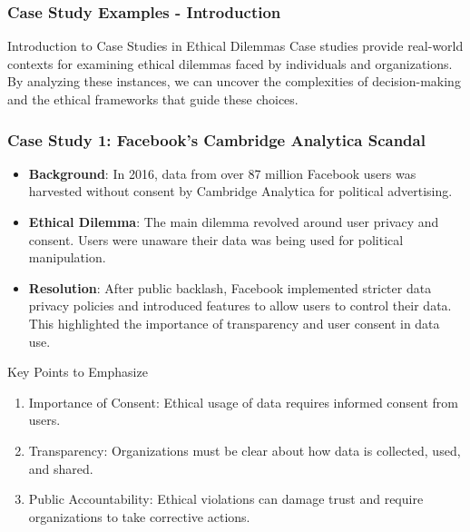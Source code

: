 \documentclass{beamer}
\begin{document}
\begin{frame}[fragile]
    \frametitle{Case Study Examples - Introduction}
    \begin{block}{Introduction to Case Studies in Ethical Dilemmas}
        Case studies provide real-world contexts for examining ethical dilemmas faced by individuals and organizations. 
        By analyzing these instances, we can uncover the complexities of decision-making and the ethical frameworks that guide these choices.
    \end{block}
\end{frame}

\begin{frame}[fragile]
    \frametitle{Case Study 1: Facebook's Cambridge Analytica Scandal}
    \begin{itemize}
        \item \textbf{Background}: In 2016, data from over 87 million Facebook users was harvested without consent by Cambridge Analytica for political advertising.
        \item \textbf{Ethical Dilemma}: The main dilemma revolved around user privacy and consent. Users were unaware their data was being used for political manipulation.
        \item \textbf{Resolution}: After public backlash, Facebook implemented stricter data privacy policies and introduced features to allow users to control their data. 
        This highlighted the importance of transparency and user consent in data use.
    \end{itemize}
    
    \begin{block}{Key Points to Emphasize}
        \begin{enumerate}
            \item Importance of Consent: Ethical usage of data requires informed consent from users.
            \item Transparency: Organizations must be clear about how data is collected, used, and shared.
            \item Public Accountability: Ethical violations can damage trust and require organizations to take corrective actions.
        \end{enumerate}
    \end{block}
\end{frame}
\end{document}
